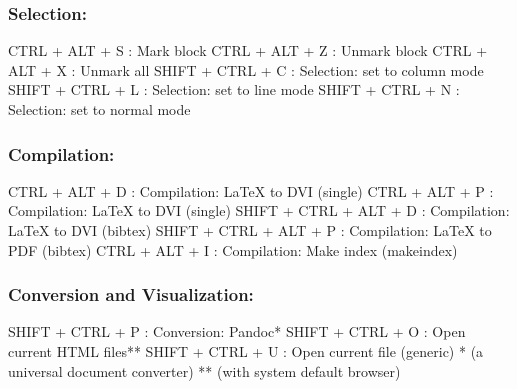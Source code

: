 \newpage
\subsubsection{Selection:}

\vspace{-0.5cm}
\begin{Rtables}[caption={[Selection keyboard shortcuts]
    Selection keyboard shortcuts},
  label=hotkey:selection]
  CTRL  + ALT  + S        : Mark block
  CTRL  + ALT  + Z        : Unmark block
  CTRL  + ALT  + X        : Unmark all
  SHIFT + CTRL + C        : Selection: set to column mode
  SHIFT + CTRL + L        : Selection: set to line mode
  SHIFT + CTRL + N        : Selection: set to normal mode
\end{Rtables}


\subsubsection{Compilation:}

\vspace{-0.5cm}
\begin{Rtables}[caption={[Compilation keyboard shortcuts]
    Compilation keyboard shortcuts},
  label=hotkey:compilation]
  CTRL  + ALT  + D       : Compilation: LaTeX to DVI (single)
  CTRL  + ALT  + P       : Compilation: LaTeX to DVI (single)
  SHIFT + CTRL + ALT + D : Compilation: LaTeX to DVI (bibtex)
  SHIFT + CTRL + ALT + P : Compilation: LaTeX to PDF (bibtex)
  CTRL  + ALT  + I       : Compilation: Make index (makeindex)
\end{Rtables}


\subsubsection{Conversion and Visualization:}

\vspace{-0.5cm}
\begin{Rtables}[caption={[Conversion and visualization keyboard shortcuts]
    Conversion and visualization keyboard shortcuts},
  label=hotkey:conversion]
  SHIFT + CTRL + P       : Conversion: Pandoc*
  SHIFT + CTRL + O       : Open current HTML files**
  SHIFT + CTRL + U       : Open current file (generic)
  *  (a universal document converter)
  ** (with system default browser)
\end{Rtables}


